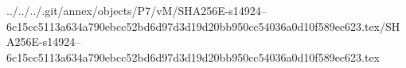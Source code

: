 ../../../.git/annex/objects/P7/vM/SHA256E-s14924--6c15cc5113a634a790ebcc52bd6d97d3d19d20bb950cc54036a0d10f589ec623.tex/SHA256E-s14924--6c15cc5113a634a790ebcc52bd6d97d3d19d20bb950cc54036a0d10f589ec623.tex